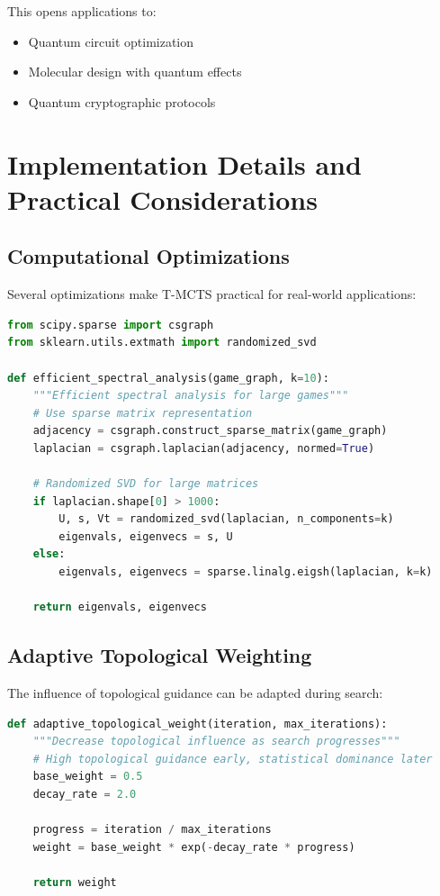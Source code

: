 \documentclass{article}
\begin{document}
This opens applications to:
\begin{itemize}
\item Quantum circuit optimization
\item Molecular design with quantum effects  
\item Quantum cryptographic protocols
\end{itemize}

\section{Implementation Details and Practical Considerations}

\subsection{Computational Optimizations}

Several optimizations make T-MCTS practical for real-world applications:

\begin{lstlisting}[language=Python, caption=Efficient Spectral Computation]
from scipy.sparse import csgraph
from sklearn.utils.extmath import randomized_svd

def efficient_spectral_analysis(game_graph, k=10):
    """Efficient spectral analysis for large games"""
    # Use sparse matrix representation
    adjacency = csgraph.construct_sparse_matrix(game_graph)
    laplacian = csgraph.laplacian(adjacency, normed=True)
    
    # Randomized SVD for large matrices
    if laplacian.shape[0] > 1000:
        U, s, Vt = randomized_svd(laplacian, n_components=k)
        eigenvals, eigenvecs = s, U
    else:
        eigenvals, eigenvecs = sparse.linalg.eigsh(laplacian, k=k)
    
    return eigenvals, eigenvecs
\end{lstlisting}

\subsection{Adaptive Topological Weighting}

The influence of topological guidance can be adapted during search:

\begin{lstlisting}[language=Python, caption=Adaptive Topological Weighting]
def adaptive_topological_weight(iteration, max_iterations):
    """Decrease topological influence as search progresses"""
    # High topological guidance early, statistical dominance later
    base_weight = 0.5
    decay_rate = 2.0
    
    progress = iteration / max_iterations
    weight = base_weight * exp(-decay_rate * progress)
    
    return weight
\end{lstlisting}
\end{document}
